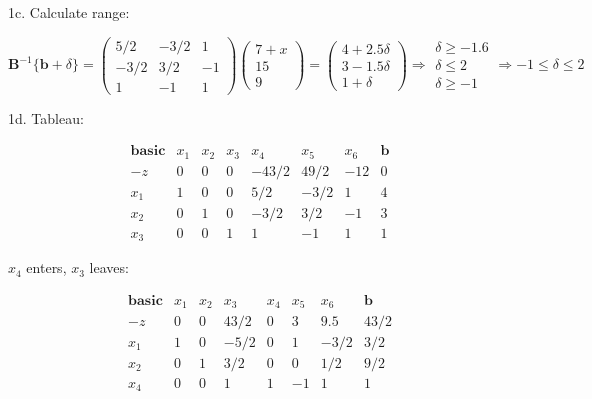 \documentclass{article}
\begin{document}
1c. Calculate range:

\begin{displaymath}
\textbf{B}^{-1}\{\textbf{b} + \delta\} = \left( \begin{array}{rrr}
5/2 & -3/2 & 1 \\
-3/2 & 3/2 & -1 \\
1 & -1 & 1
\end{array} \right)
\left( \begin{array}{c} 7 + x \\ 15 \\ 9 \end{array} \right) = \left( \begin{array}{c} 4 + 2.5 \delta \\ 3 - 1.5 \delta \\ 1 + \delta \end{array} \right) \Rightarrow
\begin{array}{l} \delta \ge -1.6 \\ \delta \le 2 \\ \delta \ge -1 \end{array} \Rightarrow -1 \le \delta \le 2
\end{displaymath}

1d. Tableau:

\begin{displaymath}
\begin{array}{c|rrrrrr|r}
\textbf{basic} & x_1 & x_2 & x_3 & x_4 & x_5 & x_6 & \textbf{b} \\ 
\hline
-z & 0 & 0 & 0 & -43/2 & 49/2 & -12 & 0 \\
\hline
x_1 & 1 & 0 & 0 & 5/2 & -3/2 & 1 & 4 \\
x_2 & 0 & 1 & 0 & -3/2 & 3/2 & -1 & 3 \\
x_3 & 0 & 0 & 1 & 1 & -1 & 1 & 1
\end{array}
\end{displaymath}

$x_4$ enters, $x_3$ leaves:

\begin{displaymath}
\begin{array}{c|rrrrrr|r}
\textbf{basic} & x_1 & x_2 & x_3 & x_4 & x_5 & x_6 & \textbf{b} \\ 
\hline
-z & 0 & 0 & 43/2 & 0 & 3 & 9.5 & 43/2 \\
\hline
x_1 & 1 & 0 & -5/2 & 0 & 1 & -3/2 & 3/2 \\
x_2 & 0 & 1 & 3/2 & 0 & 0 & 1/2 & 9/2 \\
x_4 & 0 & 0 & 1 & 1 & -1 & 1 & 1
\end{array}
\end{displaymath}
\end{document}
